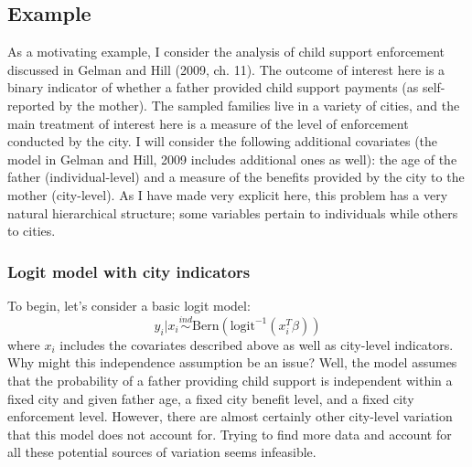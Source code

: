 \documentclass[12pt]{article}
\begin{document}
\subsection{Example}
As a motivating example, I consider the analysis of child support enforcement discussed in Gelman and Hill (2009, ch. 11). The outcome of interest here is a binary indicator of whether a father provided child
support payments (as self-reported by the mother). The sampled families live in a variety of cities, and the main treatment of interest here is a measure of the level of enforcement conducted by the city. I will 
consider the following additional covariates (the model in Gelman and Hill, 2009 includes additional ones as well): the age of the father (individual-level) and a measure of the benefits provided by the city to 
the mother (city-level). As I have made very explicit here, this problem has a very natural hierarchical structure; some variables pertain to individuals while others to cities. 

\subsubsection{Logit model with city indicators}
To begin, let's consider a basic logit model:
\[y_i|x_i \overset{ind}{\sim} \text{Bern}(\text{logit}^{-1}(x_i^T \beta)) \]
where $x_i$ includes the covariates described above as well as city-level indicators. Why might this independence assumption be an issue? Well, the model assumes that the probability of a father providing 
child support is independent within a fixed city and given father age, a fixed city benefit level, and a fixed city enforcement level. However, there are almost certainly other city-level variation that this model 
does not account for. Trying to find more data and account for all these potential sources of variation seems infeasible. 
\end{document}
